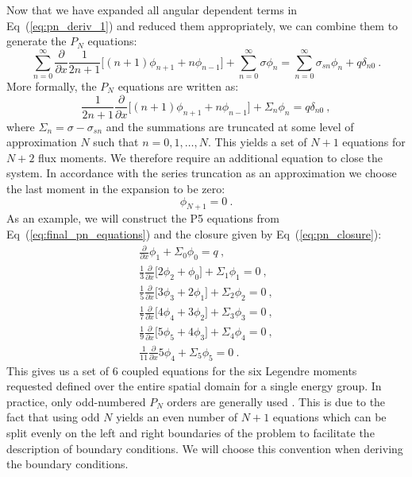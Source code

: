 Now that we have expanded all angular dependent terms in
Eq~(\ref{eq:pn_deriv_1}) and reduced them appropriately, we can
combine them to generate the $P_N$ equations:
\begin{equation}
    \sum_{n=0}^\infty \frac{\partial}{\partial x} \frac{1}{2n+1} \Big[
      (n+1) \phi_{n+1} + n \phi_{n-1} \Big] + \sum_{n=0}^\infty \sigma
    \phi_n = \sum_{n=0}^\infty \sigma_{sn} \phi_n + q\delta_{n0}\:.
  \label{eq:pn_deriv_18}
\end{equation}
More formally, the $P_N$ equations are written as:
\begin{equation}
   \frac{1}{2n+1} \frac{\partial}{\partial x}\Big[ (n+1) \phi_{n+1} + n
     \phi_{n-1} \Big] + \Sigma_n \phi_n = q\delta_{n0} \:,
  \label{eq:final_pn_equations}
\end{equation}
where $\Sigma_n = \sigma-\sigma_{sn}$ and the summations are truncated
at some level of approximation $N$ such that $n = 0,1,\dotsc,N$. This
yields a set of $N+1$ equations for $N+2$ flux moments. We therefore
require an additional equation to close the system. In accordance with
the series truncation as an approximation we choose the last moment in
the expansion to be zero:
\begin{equation}
  \phi_{N+1} = 0\:.
  \label{eq:pn_closure}
\end{equation}
As an example, we will construct the P5 equations from
Eq~(\ref{eq:final_pn_equations}) and the closure given by
Eq~(\ref{eq:pn_closure}):
\begin{subequations}
  \begin{gather}
   \frac{\partial}{\partial x}\phi_{1} + \Sigma_0 \phi_0 = q\:,\\ 
   \frac{1}{3} \frac{\partial}{\partial x}\Big[ 2
     \phi_{2} + \phi_{0} \Big] + \Sigma_1 \phi_1 = 0\:,\\
   \frac{1}{5} \frac{\partial}{\partial x}\Big[ 3 \phi_{3} + 2
     \phi_{1} \Big] + \Sigma_2 \phi_2 = 0 \:,\\
   \frac{1}{7} \frac{\partial}{\partial x}\Big[ 4 \phi_{4} + 3
     \phi_{2} \Big] + \Sigma_3 \phi_3 = 0 \:,\\
   \frac{1}{9} \frac{\partial}{\partial x}\Big[ 5 \phi_{5} + 4
     \phi_{3} \Big] + \Sigma_4 \phi_4 = 0 \:,\\
   \frac{1}{11} \frac{\partial}{\partial x} 5 \phi_{4} + \Sigma_5
   \phi_5 = 0 \:.
  \end{gather}
  \label{eq:p5_equations}
\end{subequations}
This gives us a set of 6 coupled equations for the six Legendre
moments requested defined over the entire spatial domain for a single
energy group. In practice, only odd-numbered $P_N$ orders are
generally used \citep{lewis_computational_1993}. This is due to the
fact that using odd $N$ yields an even number of $N+1$ equations which
can be split evenly on the left and right boundaries of the problem to
facilitate the description of boundary conditions. We will choose this
convention when deriving the boundary conditions.

